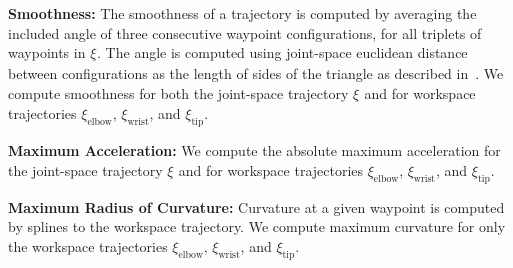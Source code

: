 \documentclass[letterpaper, 10 pt, conference]{ieeeconf}  %
\newcommand{\tj}[1]{\ensuremath{\xi_\text{#1}}}
\begin{document}
{\bf Smoothness:}
The smoothness of a trajectory is computed by averaging the included angle of three consecutive waypoint configurations, for all triplets of waypoints in \tj{}. The angle is computed using joint-space euclidean distance between configurations as the length of sides of the triangle as described in~\cite{cohen2012generic}.
We compute smoothness for both the joint-space trajectory \tj{} and for workspace trajectories $\xi_\text{elbow}$, $\xi_\text{wrist}$, and $\xi_\text{tip}$.

{\bf Maximum Acceleration:}
We compute the absolute maximum acceleration for the joint-space trajectory \tj{} and for workspace trajectories $\xi_\text{elbow}$, $\xi_\text{wrist}$, and $\xi_\text{tip}$.

{\bf Maximum Radius of Curvature: }
Curvature at a given waypoint is computed by splines to the workspace trajectory. We compute maximum curvature for only the workspace trajectories $\xi_\text{elbow}$, $\xi_\text{wrist}$, and $\xi_\text{tip}$.
\end{document}
